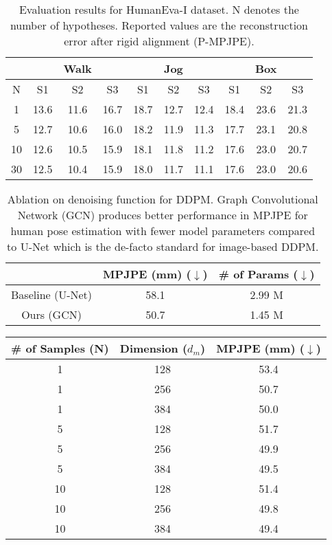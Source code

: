 \documentclass[letterpaper, 10 pt, conference]{ieeeconf}
\begin{document}
\begin{table}[t]
    \centering
    \resizebox{0.45\textwidth}{!}
    {
    \begin{tabular}{c|c c c|c c c|c c c}
    \toprule
          & & Walk & & & Jog & & & Box & \\\hline
         N& S1 & S2 & S3 & S1 & S2 & S3 & S1 & S2 & S3\\
    \midrule
         1 &  13.6& 11.6 & 16.7 & 18.7 & 12.7 &12.4 &  18.4 & 23.6 & 21.3\\
         5 & 12.7& 10.6& 16.0 & 18.2&11.9 &11.3 & 17.7 & 23.1 & 20.8\\
         10 & 12.6 &10.5 &15.9 &18.1 &11.8 &11.2 &17.6 &23.0 & 20.7 \\
         30 & 12.5 & 10.4& 15.9& 18.0& 11.7& 11.1& 17.6 & 23.0 & 20.6\\

    \bottomrule
    \end{tabular}
    }
    \caption{Evaluation results for HumanEva-I dataset. N denotes the number of hypotheses. Reported values are the reconstruction error after rigid alignment (P-MPJPE).}
    \label{tab:table5}
\end{table} \begin{table}[t]
    \centering
    \resizebox{0.4\textwidth}{!}
    {
    \begin{tabular}{c|c|c}
    \toprule
    &MPJPE (mm) ($\downarrow$)& \# of Params ($\downarrow$)\\
    \midrule
         Baseline (U-Net) & 58.1&2.99 M \\
         Ours (GCN)& 50.7 & 1.45 M\\
    \bottomrule
    \end{tabular}
    }
    \caption{Ablation on denoising function for DDPM.
    Graph Convolutional Network (GCN) produces better performance in MPJPE for human pose estimation with fewer model parameters compared to U-Net which is the de-facto standard for image-based DDPM.
    }
    \label{tab:table2}
    \vspace{-10pt}
\end{table} \begin{table}[t]
    \centering
    \resizebox{0.35\textwidth}{!}
    {
    \begin{tabular}{c|c|c}
    \toprule
         \# of Samples (N)&Dimension ($d_{m}$) & MPJPE (mm) ($\downarrow$)  \\
    \midrule
         1 & 128 & 53.4 \\
         1 & 256 & 50.7 \\
         1 & 384 & 50.0\\
         \hline
         5 & 128 & 51.7 \\
         5 & 256 & 49.9\\
         5 & 384 & 49.5\\
         \hline
         10 & 128 & 51.4 \\
         10 & 256 & 49.8\\
         10 & 384 & 49.4\\
    

\end{tabular}}
\end{table}
\end{document}
